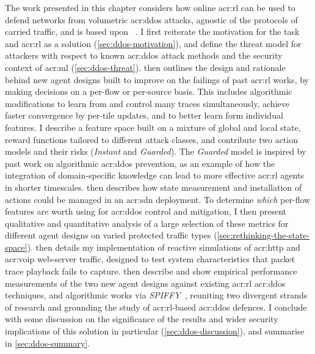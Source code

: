 The work presented in this chapter considers how online \gls{acr:rl} can be used to defend networks from volumetric \gls{acr:ddos} attacks, agnostic of the protocols of carried traffic, and is based upon ~\parencite{DBLP:journals/tnsm/SimpsonRP20}.
I first reiterate the motivation for the task and \gls{acr:rl} as a solution (\cref{sec:ddos-motivation}), and define the threat model for attackers with respect to known \gls{acr:ddos} attack methods and the security context of \gls{acr:ml} (\cref{sec:ddos-threat}).
 then outlines the design and rationale behind new agent designs built to improve on the failings of past \gls{acr:rl} works, by making decisions on a per-flow or per-source basis.
This includes algorithmic modifications to learn from and control many traces simultaneously, achieve faster convergence by per-tile updates, and to better learn form individual features.
I describe a feature space built on a mixture of global and local state, reward functions tailored to different attack classes, and contribute two action models and their risks (\emph{Instant} and \emph{Guarded}).
The \emph{Guarded} model is inspired by past work on algorithmic \gls{acr:ddos} prevention, as an example of how the integration of domain-specific knowledge can lead to more effective \gls{acr:rl} agents in shorter timescales.
 then describes how state measurement and installation of actions could be managed in an \gls{acr:sdn} deployment.
To determine \emph{which} per-flow features are worth using for \gls{acr:ddos} control and mitigation, I then present qualitative and quantitative analysis of a large selection of these metrics for different agent designs on varied protected traffic types (\cref{sec:rethinking-the-state-space}).
 then details my implementation of reactive simulations of \gls{acr:http} and \gls{acr:voip} web-server traffic, designed to test system characteristics that packet trace playback fails to capture.
 then describe and show empirical performance measurements of the two new agent designs against existing \gls{acr:rl} \gls{acr:ddos} techniques, and algorithmic works via \emph{SPIFFY}~\parencite{DBLP:conf/ndss/KangGS16}, reuniting two divergent strands of research and grounding the study of \gls{acr:rl}-based \gls{acr:ddos} defences.
I conclude with some discussion on the significance of the results and wider security implications of this solution in particular (\cref{sec:ddos-discussion}), and summarise in \cref{sec:ddos-summary}.

